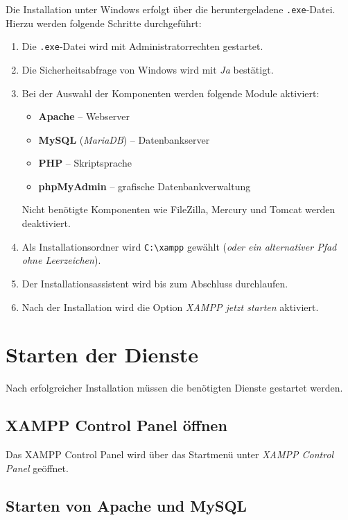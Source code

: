 Die Installation unter Windows erfolgt über die heruntergeladene \texttt{.exe}-Datei. Hierzu werden folgende Schritte durchgeführt:

\begin{enumerate}
    \item Die \texttt{.exe}-Datei wird mit Administratorrechten gestartet.
    \item Die Sicherheitsabfrage von Windows wird mit \glqq{}\textit{Ja}\grqq{} bestätigt.
    \item Bei der Auswahl der Komponenten werden folgende Module aktiviert:
          \begin{itemize}
              \item \textbf{Apache} – Webserver
              \item \textbf{My\acs{SQL}} (\textit{Maria\acs{DB}}) – Datenbankserver
              \item \textbf{\acs{PHP}} – Skriptsprache
              \item \textbf{phpMyAdmin} – grafische Datenbankverwaltung
          \end{itemize}
          Nicht benötigte Komponenten wie FileZilla, Mercury und Tomcat werden deaktiviert.
    \item Als Installationsordner wird \texttt{C:\textbackslash xampp} gewählt (\textit{oder ein alternativer Pfad ohne Leerzeichen}).
    \item Der Installationsassistent wird bis zum Abschluss durchlaufen.
    \item Nach der Installation wird die Option \glqq{}\textit{\acs{XAMPP} jetzt starten}\grqq{} aktiviert.
\end{enumerate}

\section{Starten der Dienste}

Nach erfolgreicher Installation müssen die benötigten Dienste gestartet werden.

\subsection{\acs{XAMPP} Control Panel öffnen}

Das \acs{XAMPP} Control Panel wird über das Startmenü unter \glqq{}\textit{XAMPP Control Panel}\grqq{} geöffnet.

\subsection{Starten von Apache und My\acs{SQL}}

